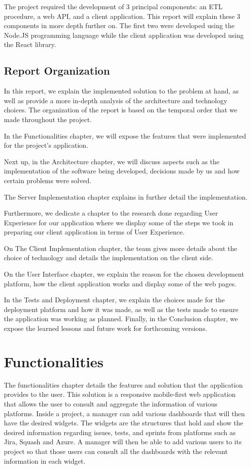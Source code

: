 \documentclass[a4paper,twoside,10pt]{report}
\begin{document}
The project required the development of 3 principal components: an ETL procedure, a web API, and a client application. This report will explain these 3 components in more depth further on.
The first two were developed using the Node.JS programming language while the client application was developed using the React library.

\section{Report Organization}
In this report, we explain the implemented solution to the problem at hand, as well as provide a more in-depth analysis of the architecture and technology choices. The organization of the report is based on the temporal order that we made throughout the project.

In the Functionalities chapter, we will expose the features that were implemented for the project's application.

Next up, in the Architecture chapter, we will discuss aspects such as the implementation of the software being developed, decisions made by us and how certain problems were solved.

The Server Implementation chapter explains in further detail the implementation.

Furthermore, we dedicate a chapter to the research done regarding User Experience for our application where we display some of the steps we took in preparing our client application in terms of User Experience.

On The Client Implementation chapter, the team gives more details about the choice of technology and details the implementation on the client side.

On the User Interface chapter, we explain the reason for the chosen development platform, how the client application works and display some of the web pages.  

In the Tests and Deployment chapter, we explain the choices made for the deployment platform and how it was made, as well as the tests made to ensure the application was working as planned. Finally, in the Conclusion chapter, we expose the learned lessons and future work for forthcoming versions.

\chapter{Functionalities}

The functionalities chapter details the features and solution that the application provides to the user. This solution is a responsive mobile-first web application that allows the user to consult and aggregate the information of various platforms. Inside a project, a manager can add various dashboards that will then have the desired widgets. The widgets are the structures that hold and show the desired information regarding issues, tests, and sprints from platforms such as Jira\cite{JIRA}, Squash\cite{SQUASH} and Azure\cite{AZURE}. A manager will then be able to add various users to its project so that those users can consult all the dashboards with the relevant information in each widget.
\end{document}
